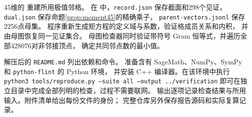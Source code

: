 45维的  重建所用极值邻格。
在  中，\texttt{record.json} 保存截面和298个见证，
\texttt{dual.json} 保存命题\ref{prop:moment45}的精确乘子，
\texttt{parent-vectors.jsonl} 保存2256点母集。
程序重新生成矩方程的定义域与系数，验证格成员关系和内积，
并由母图恢复同一见证集合。
母图检查器同时验证带符号 Gram 恒等式，并遍历全部428076对非邻接顶点，
确定共同邻点数的最小值。

解压后的 \texttt{README.md} 列出依赖和命令。
准备含有 SageMath、NumPy、SymPy 和 \texttt{python-flint} 的 Python 环境，
并安装 C++ 编译器。在该环境中执行
\texttt{python3 tools/reproduce.py --suite all --output ../verification}
即可在独立目录中完成全部列明的检查，过程不需要联网。
输出逐项记录检查结果与所用输入。附件清单给出每份文件的身份；
完整仓库另外保存报告源码和实际复算记录。
